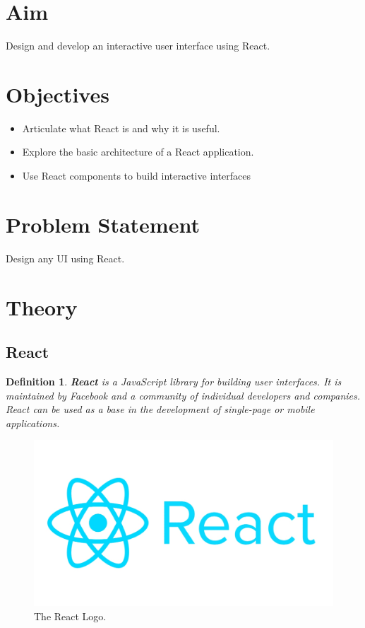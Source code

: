 \documentclass[11pt]{article}
\newtheorem{dfn}[thm]{Definition}
\begin{document}
\tableofcontents
\thispagestyle{empty}
\clearpage

\setcounter{page}{1}

\section{Aim}
Design and develop an interactive user interface using React.

\section{Objectives}
\begin{itemize}
    \item Articulate what React is and why it is useful.
    \item Explore the basic architecture of a React application.
    \item Use React components to build interactive interfaces
\end{itemize}

\section{Problem Statement}
Design any UI using React.

\section{Theory}
\subsection{React}

\begin{dfn}
    \textbf{React} is a JavaScript library for building user interfaces. It is maintained by Facebook and a community of individual developers and companies. React can be used as a base in the development of single-page or mobile applications.
\end{dfn}

\begin{figure}[H]
    \centering
    \includegraphics[width=.75\textwidth]{react/react_2.jpg}
    \caption{The React Logo. }
\end{figure}
\end{document}
